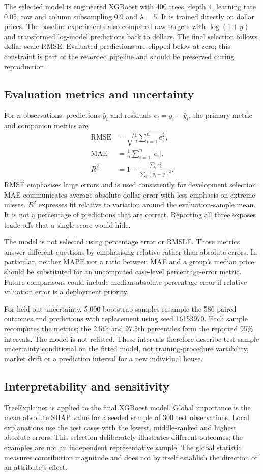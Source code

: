 \documentclass{sigkddExp}
\begin{document}
The selected model is engineered XGBoost with 400 trees, depth 4, learning rate 0.05, row and column subsampling 0.9 and $\lambda=5$. It is trained directly on dollar prices. The baseline experiments also compared raw targets with $\log(1+y)$ and transformed log-model predictions back to dollars. The final selection follows dollar-scale RMSE. Evaluated predictions are clipped below at zero; this constraint is part of the recorded pipeline and should be preserved during reproduction.

\subsection{Evaluation metrics and uncertainty}
For $n$ observations, predictions $\hat y_i$ and residuals $e_i=y_i-\hat y_i$, the primary metric and companion metrics are
\begin{align}
\mathrm{RMSE}&=\sqrt{\frac{1}{n}\sum_{i=1}^n e_i^2},\\
\mathrm{MAE}&=\frac{1}{n}\sum_{i=1}^n |e_i|,\\
R^2&=1-\frac{\sum_i e_i^2}{\sum_i(y_i-\bar y)^2}.
\end{align}
RMSE emphasises large errors and is used consistently for development selection. MAE communicates average absolute dollar error with less emphasis on extreme misses. $R^2$ expresses fit relative to variation around the evaluation-sample mean. It is not a percentage of predictions that are correct. Reporting all three exposes trade-offs that a single score would hide.

The model is not selected using percentage error or RMSLE. Those metrics answer different questions by emphasising relative rather than absolute errors. In particular, neither MAPE nor a ratio between MAE and a group's median price should be substituted for an uncomputed case-level percentage-error metric. Future comparisons could include median absolute percentage error if relative valuation error is a deployment priority.

For held-out uncertainty, 5,000 bootstrap samples resample the 586 paired outcomes and predictions with replacement using seed 16153970. Each sample recomputes the metrics; the 2.5th and 97.5th percentiles form the reported 95\% intervals. The model is not refitted. These intervals therefore describe test-sample uncertainty conditional on the fitted model, not training-procedure variability, market drift or a prediction interval for a new individual house.

\subsection{Interpretability and sensitivity}
TreeExplainer is applied to the final XGBoost model. Global importance is the mean absolute SHAP value for a seeded sample of 300 test observations. Local explanations use the test cases with the lowest, middle-ranked and highest absolute errors. This selection deliberately illustrates different outcomes; the examples are not an independent representative sample. The global statistic measures contribution magnitude and does not by itself establish the direction of an attribute's effect.
\end{document}
